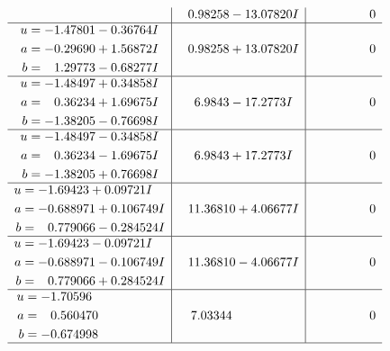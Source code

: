 \documentclass[1p]{elsarticle_modified}
\theoremstyle{definition}
\begin{document}
$$\begin{array}{c|c|c}
 & \phantom{-}0.98258 - 13.07820 I & \phantom{-0.000000 } 0 \\ \hline\begin{aligned}
u &= -1.47801 - 0.36764 I \\
a &= -0.29690 + 1.56872 I \\
b &= \phantom{-}1.29773 - 0.68277 I\end{aligned}
 & \phantom{-}0.98258 + 13.07820 I & \phantom{-0.000000 } 0 \\ \hline\begin{aligned}
u &= -1.48497 + 0.34858 I \\
a &= \phantom{-}0.36234 + 1.69675 I \\
b &= -1.38205 - 0.76698 I\end{aligned}
 & \phantom{-}6.9843 - 17.2773 I & \phantom{-0.000000 } 0 \\ \hline\begin{aligned}
u &= -1.48497 - 0.34858 I \\
a &= \phantom{-}0.36234 - 1.69675 I \\
b &= -1.38205 + 0.76698 I\end{aligned}
 & \phantom{-}6.9843 + 17.2773 I & \phantom{-0.000000 } 0 \\ \hline\begin{aligned}
u &= -1.69423 + 0.09721 I \\
a &= -0.688971 + 0.106749 I \\
b &= \phantom{-}0.779066 - 0.284524 I\end{aligned}
 & \phantom{-}11.36810 + 4.06677 I & \phantom{-0.000000 } 0 \\ \hline\begin{aligned}
u &= -1.69423 - 0.09721 I \\
a &= -0.688971 - 0.106749 I \\
b &= \phantom{-}0.779066 + 0.284524 I\end{aligned}
 & \phantom{-}11.36810 - 4.06677 I & \phantom{-0.000000 } 0 \\ \hline\begin{aligned}
u &= -1.70596\phantom{ +0.000000I} \\
a &= \phantom{-}0.560470\phantom{ +0.000000I} \\
b &= -0.674998\phantom{ +0.000000I}\end{aligned}
 & \phantom{-}7.03344\phantom{ +0.000000I} & \phantom{-0.000000 } 0\\
 \hline 
 \end{array}$$\newpage\newpage\renewcommand{\arraystretch}{1}
\end{document}
